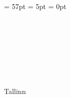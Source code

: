 
\begin{titlepage}
\headheight = 57pt
\footskip = 5pt
\headsep = 0pt

\centering
\university\\
\school

\vspace*{4.5 cm}

\begin{center}

\authorName~~\studentcode~~\signatureDate\\
\vspace*{1.5 cm}

\begin{Large}

\textsc{\textbf{\doctitle}}\\
\end{Large}

\vspace*{1.5 cm}
\doctype\\
\end{center}

\vspace*{0.6 cm}

\vspace*{0.2 cm}

\vfill

Tallinn \Year
\end{titlepage}

\pagebreak

